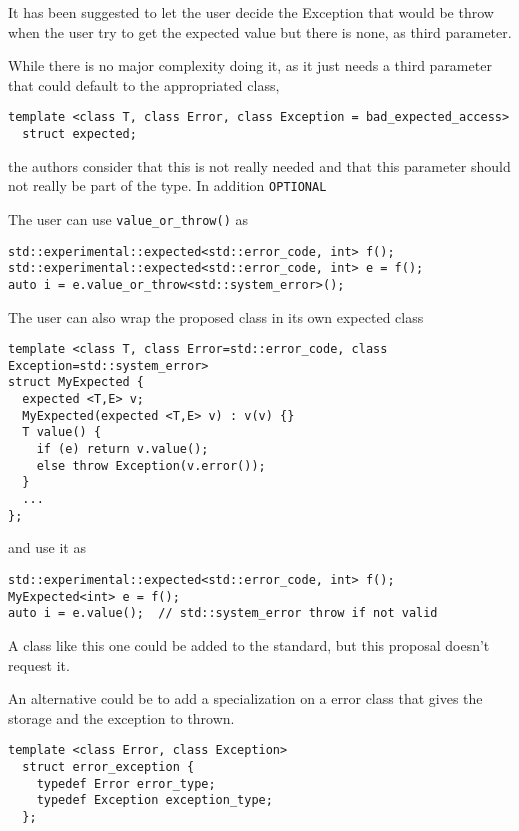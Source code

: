 \documentclass[a4paper,10pt]{article}
\newcommand{\cpp}[1]{\lstinline{#1}}
\begin{document}
It has been suggested to let the user decide the Exception that would be throw when the user try to get the expected value but there is none, as third parameter. 

While there is no major complexity doing it, as it just needs a third parameter that could default to the appropriated class, 

\begin{lstlisting}
template <class T, class Error, class Exception = bad_expected_access>
  struct expected;
\end{lstlisting}

the authors consider that this is not really needed and that this parameter should not really be part of the type. In addition \cpp{OPTIONAL}

The user can use \cpp{value_or_throw()} as

\begin{lstlisting}
std::experimental::expected<std::error_code, int> f();
std::experimental::expected<std::error_code, int> e = f();
auto i = e.value_or_throw<std::system_error>();  
\end{lstlisting}

The user can also wrap the proposed class in its own expected class

\begin{lstlisting}
template <class T, class Error=std::error_code, class Exception=std::system_error>
struct MyExpected {
  expected <T,E> v;
  MyExpected(expected <T,E> v) : v(v) {}
  T value() {  
    if (e) return v.value();
    else throw Exception(v.error());
  }
  ...
};
\end{lstlisting}

and use it as

\begin{lstlisting}
std::experimental::expected<std::error_code, int> f();
MyExpected<int> e = f();
auto i = e.value();  // std::system_error throw if not valid
\end{lstlisting}

A class like this one could be added to the standard, but this proposal doesn't request it. 

An alternative could be to add a specialization on a error class that gives the storage and the exception to thrown.

\begin{lstlisting}
template <class Error, class Exception>
  struct error_exception {
    typedef Error error_type;
    typedef Exception exception_type;
  };
\end{lstlisting}
\end{document}
